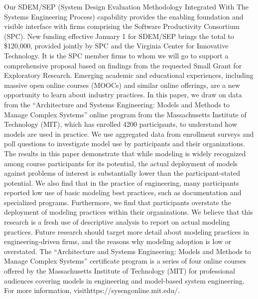 Our SDEM/SEP (System Design Evaluation Methodology Integrated With The Systems Engineering Process) capability provides the enabling foundation and visible interface with firms comprising the Software Productivity Consortium (SPC). New funding effective January 1 for SDEM/SEP brings the total to \$120,000, provided jointly by SPC and the Virginia Center for Innovative Technology. It is the SPC member firms to whom we will go to support a comprehensive proposal based on findings from the requested Small Grant for Exploratory Research.
Emerging academic and educational experiences, including massive open online courses (MOOCs) and similar online offerings, are a new opportunity to learn about industry practices. In this paper, we draw on data from the “Architecture and Systems Engineering: Models and Methods to Manage Complex Systems” online program from the Massachusetts Institute of Technology (MIT), which has enrolled 4200 participants, to understand how models are used in practice. We use aggregated data from enrollment surveys and poll questions to investigate model use by participants and their organizations.
The results in this paper demonstrate that while modeling is widely recognized among course participants for its potential, the actual deployment of models against problems of interest is substantially lower than the participant-stated potential. We also find that in the practice of engineering, many participants reported low use of basic modeling best practices, such as documentation and specialized programs. Furthermore, we find that participants overstate the deployment of modeling practices within their organizations.
We believe that this research is a fresh use of descriptive analysis to report on actual modeling practices. Future research should target more detail about modeling practices in engineering-driven firms, and the reasons why modeling adoption is low or overstated.
The “Architecture and Systems Engineering: Models and Methods to Manage Complex Systems” certificate program is a series of four online courses offered by the Massachusetts Institute of Technology (MIT) for professional audiences covering models in engineering and model-based system engineering. For more information, visithttps://sysengonline.mit.edu/.


